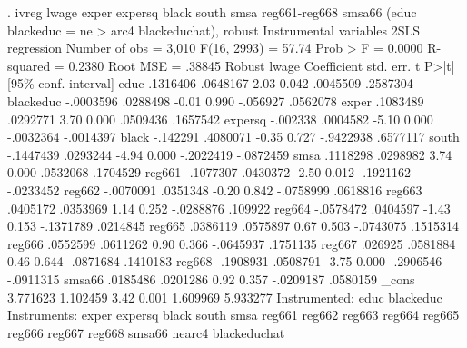 . ivreg lwage exper expersq black south smsa reg661-reg668 smsa66 (educ blackeduc = ne
> arc4 blackeduchat), robust
{\smallskip}
Instrumental variables 2SLS regression          Number of obs     =      3,010
                                                F(16, 2993)       =      57.74
                                                Prob > F          =     0.0000
                                                R-squared         =     0.2380
                                                Root MSE          =     .38845
{\smallskip}
             {\VBAR}               Robust
       lwage {\VBAR} Coefficient  std. err.      t    P>|t|     [95\% conf. interval]
        educ {\VBAR}   .1316406   .0648167     2.03   0.042     .0045509    .2587304
   blackeduc {\VBAR}  -.0003596   .0288498    -0.01   0.990     -.056927    .0562078
       exper {\VBAR}   .1083489   .0292771     3.70   0.000     .0509436    .1657542
     expersq {\VBAR}   -.002338   .0004582    -5.10   0.000    -.0032364   -.0014397
       black {\VBAR}   -.142291   .4080071    -0.35   0.727    -.9422938    .6577117
       south {\VBAR}  -.1447439   .0293244    -4.94   0.000    -.2022419   -.0872459
        smsa {\VBAR}   .1118298   .0298982     3.74   0.000     .0532068    .1704529
      reg661 {\VBAR}  -.1077307   .0430372    -2.50   0.012    -.1921162   -.0233452
      reg662 {\VBAR}  -.0070091   .0351348    -0.20   0.842    -.0758999    .0618816
      reg663 {\VBAR}   .0405172   .0353969     1.14   0.252    -.0288876     .109922
      reg664 {\VBAR}  -.0578472   .0404597    -1.43   0.153    -.1371789    .0214845
      reg665 {\VBAR}   .0386119   .0575897     0.67   0.503    -.0743075    .1515314
      reg666 {\VBAR}   .0552599   .0611262     0.90   0.366    -.0645937    .1751135
      reg667 {\VBAR}    .026925   .0581884     0.46   0.644    -.0871684    .1410183
      reg668 {\VBAR}  -.1908931   .0508791    -3.75   0.000    -.2906546   -.0911315
      smsa66 {\VBAR}   .0185486   .0201286     0.92   0.357    -.0209187    .0580159
       _cons {\VBAR}   3.771623   1.102459     3.42   0.001     1.609969    5.933277
Instrumented: educ blackeduc
 Instruments: exper expersq black south smsa reg661 reg662 reg663 reg664
              reg665 reg666 reg667 reg668 smsa66 nearc4 blackeduchat
{\smallskip}
